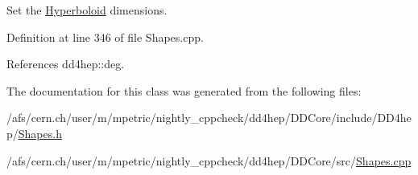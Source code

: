 Set the \hyperlink{class_d_d4hep_1_1_geometry_1_1_hyperboloid}{Hyperboloid} dimensions. 



Definition at line 346 of file Shapes.\+cpp.



References dd4hep\+::deg.



The documentation for this class was generated from the following files\+:\begin{DoxyCompactItemize}
\item 
/afs/cern.\+ch/user/m/mpetric/nightly\+\_\+cppcheck/dd4hep/\+D\+D\+Core/include/\+D\+D4hep/\hyperlink{_shapes_8h}{Shapes.\+h}\item 
/afs/cern.\+ch/user/m/mpetric/nightly\+\_\+cppcheck/dd4hep/\+D\+D\+Core/src/\hyperlink{_shapes_8cpp}{Shapes.\+cpp}\end{DoxyCompactItemize}
